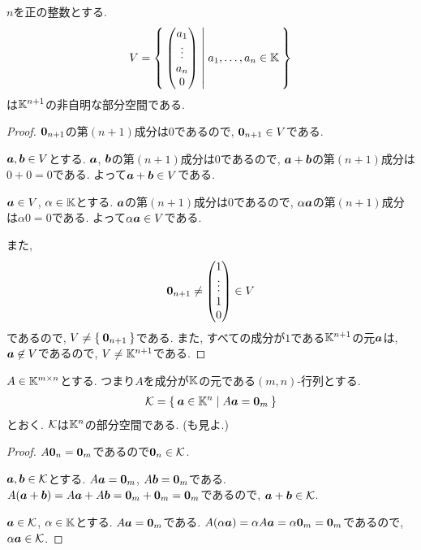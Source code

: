 \begin{example}
$n$を正の整数とする.
  \begin{align*}
    V=\Set{\begin{pmatrix}a_1\\\vdots\\a_n\\0\end{pmatrix}|a_1,\ldots,a_n\in\mathbb{K}}
  \end{align*}
  は$\mathbb{K}^{n+1}$の非自明な部分空間である.
\end{example}
\begin{proof}
$\boldsymbol{0}_{n+1}$の第$(n+1)$成分は$0$であるので, $\boldsymbol{0}_{n+1}\in V$である.

$\boldsymbol{a},\boldsymbol{b}\in V$とする.
$\boldsymbol{a}$, $\boldsymbol{b}$の第$(n+1)$成分は$0$であるので,
$\boldsymbol{a}+\boldsymbol{b}$の第$(n+1)$成分は$0+0=0$である.
よって$\boldsymbol{a}+\boldsymbol{b}\in V$である.

$\boldsymbol{a}\in V$,
$\alpha\in \mathbb{K}$とする.
$\boldsymbol{a}$の第$(n+1)$成分は$0$であるので,
$\alpha\boldsymbol{a}$の第$(n+1)$成分は$\alpha 0=0$である.
よって$\alpha\boldsymbol{a}\in V$である.

また,
\begin{align*}
\boldsymbol{0}_{n+1}\neq
\begin{pmatrix}1\\\vdots\\1\\0\end{pmatrix}\in V
\end{align*}
であるので, $V\neq\Set{\boldsymbol{0}_{n+1}}$である.
また, すべての成分が$1$である$\mathbb{K}^{n+1}$の元$\boldsymbol{a}$は,
$\boldsymbol{a}\not\in V$であるので, $V\neq \mathbb{K}^{n+1}$である.
\end{proof}

\begin{example}
  \label{subsp:example:fiber}
  $A\in \mathbb{K}^{m\times n}$とする.
  つまり$A$を成分が$\mathbb{K}$の元である$(m,n)$-行列とする.
  \begin{align*}
    \mathcal{K}=\Set{\boldsymbol{a}\in \mathbb{K}^n|A\boldsymbol{a}=\boldsymbol{0}_m}
  \end{align*}
  とおく. $\mathcal{K}$は$\mathbb{K}^n$の部分空間である.
  (も見よ.)
\end{example}
\begin{proof}
$A\boldsymbol{0}_n=\boldsymbol{0}_m$であるので$\boldsymbol{0}_n\in \mathcal{K}$.

$\boldsymbol{a},\boldsymbol{b}\in\mathcal{K}$とする.
$A\boldsymbol{a}=\boldsymbol{0}_m$, $A\boldsymbol{b}=\boldsymbol{0}_m$である.
$A(\boldsymbol{a}+\boldsymbol{b})=A\boldsymbol{a}+A\boldsymbol{b}=\boldsymbol{0}_m+\boldsymbol{0}_m=\boldsymbol{0}_m$であるので,
$\boldsymbol{a}+\boldsymbol{b}\in \mathcal{K}$.

$\boldsymbol{a}\in\mathcal{K}$, $\alpha\in\mathbb{K}$とする.
$A\boldsymbol{a}=\boldsymbol{0}_m$である.
$A(\alpha\boldsymbol{a})=\alpha A\boldsymbol{a}=\alpha\boldsymbol{0}_m=\boldsymbol{0}_m$であるので,
$\alpha\boldsymbol{a}\in \mathcal{K}$.
\end{proof}

